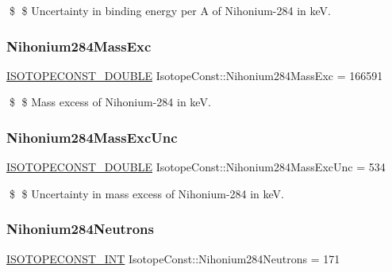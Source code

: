 \$ \$ Uncertainty in binding energy per A of Nihonium-\/284 in keV. \mbox{\label{group___isotope_const-_nihonium-_nh284_gaf9f8d5fb5c849b287ba1a722faac52f3}} 
\subsubsection{\texorpdfstring{Nihonium284\+Mass\+Exc}{Nihonium284MassExc}}
{\footnotesize\ttfamily \mbox{\hyperlink{group___isotope_const-_macros_ga8f45a7272ce02c0b4c65c44636ed719a}{I\+S\+O\+T\+O\+P\+E\+C\+O\+N\+S\+T\+\_\+\+D\+O\+U\+B\+LE}} Isotope\+Const\+::\+Nihonium284\+Mass\+Exc = 166591}

\$ \$ Mass excess of Nihonium-\/284 in keV. \mbox{\label{group___isotope_const-_nihonium-_nh284_gaf1a60917e91b2ed1853e5067f99dc04b}} 
\subsubsection{\texorpdfstring{Nihonium284\+Mass\+Exc\+Unc}{Nihonium284MassExcUnc}}
{\footnotesize\ttfamily \mbox{\hyperlink{group___isotope_const-_macros_ga8f45a7272ce02c0b4c65c44636ed719a}{I\+S\+O\+T\+O\+P\+E\+C\+O\+N\+S\+T\+\_\+\+D\+O\+U\+B\+LE}} Isotope\+Const\+::\+Nihonium284\+Mass\+Exc\+Unc = 534}

\$ \$ Uncertainty in mass excess of Nihonium-\/284 in keV. \mbox{\label{group___isotope_const-_nihonium-_nh284_ga604d3bcd0b6c1f94a4cef7c3dc66bc76}} 
\subsubsection{\texorpdfstring{Nihonium284\+Neutrons}{Nihonium284Neutrons}}
{\footnotesize\ttfamily \mbox{\hyperlink{group___isotope_const-_macros_ga5f18360b3e99483a35c32d789e62621c}{I\+S\+O\+T\+O\+P\+E\+C\+O\+N\+S\+T\+\_\+\+I\+NT}} Isotope\+Const\+::\+Nihonium284\+Neutrons = 171}

